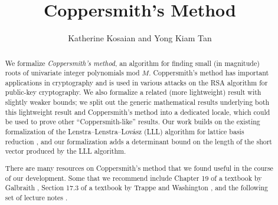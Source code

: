 \documentclass[11pt,a4paper]{article}
\begin{document}
\title{Coppersmith's Method}
\author{Katherine Kosaian and Yong Kiam Tan}
\maketitle

\begin{abstract}
We formalize \textit{Coppersmith's method}, an algorithm for finding small (in magnitude) roots of univariate integer polynomials mod $M$.
Coppersmith's method has important applications in cryptography and is used in various attacks on the RSA algorithm for public-key cryptography.
We also formalize a related (more lightweight) result with slightly weaker bounds; we split out the generic mathematical results underlying both this lightweight result and Coppersmith's method into a dedicated locale, which could be used to prove other ``Coppersmith-like'' results.
Our work builds on the existing formalization of the Lenstra–Lenstra–Lov\'asz (LLL) algorithm for lattice basis reduction \cite{LLL_Basis_Reduction-AFP}, and our formalization adds a determinant bound on the length of the short vector produced by the LLL algorithm.

There are many resources on Coppersmith's method that we found useful in the course of our development.  Some that we recommend include Chapter 19 of a textbook by Galbraith \cite{DBLP:books/cu/Galbraith2012}, Section 17.3 of a textbook by Trappe and Washington \cite{10.5555/1211288}, and the following set of lecture notes \cite{lectureNotes}.
\end{abstract}

\tableofcontents





\end{document}
